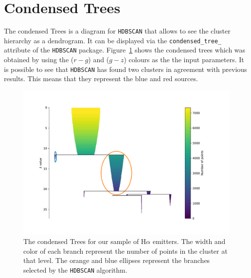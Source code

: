 \documentclass[fleqn,usenatbib]{mnras}
\begin{document}

 



\clearpage
\appendix
\section{Condensed Trees}
\label{sec:trees}

The condensed Trees is a diagram for \texttt{HDBSCAN} that allows to see the cluster 
hierarchy as a dendrogram.  It can be displayed via the \texttt{condensed\_tree\_}
attribute of the \texttt{HDBSCAN} package. Figure~\ref{fig:condensed-trees} shows
the condensed trees which was obtained by using the ($r - g$) and ($g - z$) colours as the
the input parameters. It is possible to see that \texttt{HDBSCAN} has found
two clusters in agreement with previous results. This means that they represent the blue 
and red sources.  

\begin{figure}
	\includegraphics[width=0.9\linewidth]{Figs/cluster-hierarchy-hdbscan.pdf}
        \caption{The condensed Trees for our sample of H{$\alpha$} emitters. 
        The width and color of each branch represent the number of points in the cluster at that level.
        The orange and blue ellipses represent the branches selected by the \texttt{HDBSCAN} algorithm.}
    \label{fig:condensed-trees}
\end{figure}

\newcommand\TableHeader{
  \hline\hline
  Id Object & \(\mathrm{RA}\) & \(\mathrm{Dec}\) & Type & Redshift & Group & P(Blue) &  P(Red)\\
            &                 &                  &      &          &{\sc hac}& {\sc hdbscan}& {\sc hdbscan} \\
  \hline 
}
\end{document}
